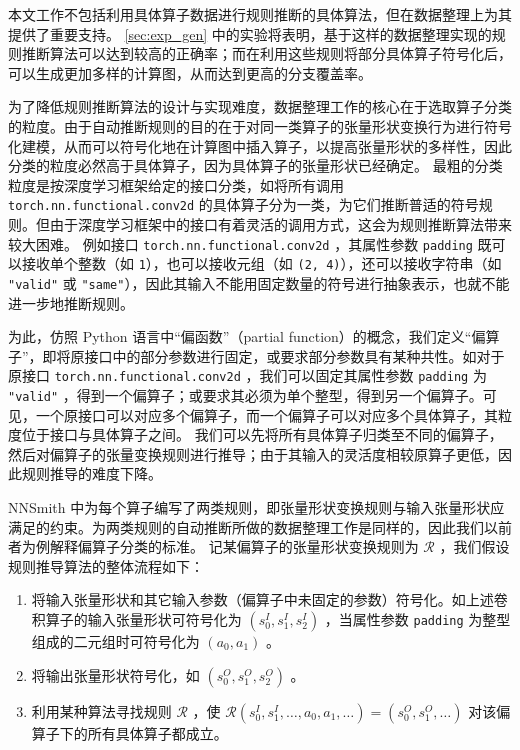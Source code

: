 本文工作不包括利用具体算子数据进行规则推断的具体算法，但在数据整理上为其提供了重要支持。 \ref{sec:exp_gen} 中的实验将表明，基于这样的数据整理实现的规则推断算法可以达到较高的正确率；而在利用这些规则将部分具体算子符号化后，可以生成更加多样的计算图，从而达到更高的分支覆盖率。

为了降低规则推断算法的设计与实现难度，数据整理工作的核心在于选取算子分类的粒度。由于自动推断规则的目的在于对同一类算子的张量形状变换行为进行符号化建模，从而可以符号化地在计算图中插入算子，以提高张量形状的多样性，因此分类的粒度必然高于具体算子，因为具体算子的张量形状已经确定。
最粗的分类粒度是按深度学习框架给定的接口分类，如将所有调用 \texttt{torch.nn.functional.conv2d} 的具体算子分为一类，为它们推断普适的符号规则。但由于深度学习框架中的接口有着灵活的调用方式，这会为规则推断算法带来较大困难。
例如接口 \texttt{torch.nn.functional.conv2d} \cite{torch_f_conv2d}，其属性参数 \texttt{padding} 既可以接收单个整数（如 \texttt{1}），也可以接收元组（如 \texttt{(2, 4)}），还可以接收字符串（如 \texttt{"valid"} 或 \texttt{"same"}），因此其输入不能用固定数量的符号进行抽象表示，也就不能进一步地推断规则。

为此，仿照 Python 语言中“偏函数”（partial function）\cite{python_partial}的概念，我们定义“偏算子”，即将原接口中的部分参数进行固定，或要求部分参数具有某种共性。如对于原接口 \texttt{torch.nn.functional.conv2d} ，我们可以固定其属性参数 \texttt{padding} 为 \texttt{"valid"} ，得到一个偏算子；或要求其必须为单个整型，得到另一个偏算子。可见，一个原接口可以对应多个偏算子，而一个偏算子可以对应多个具体算子，其粒度位于接口与具体算子之间。
我们可以先将所有具体算子归类至不同的偏算子，然后对偏算子的张量变换规则进行推导；由于其输入的灵活度相较原算子更低，因此规则推导的难度下降。

NNSmith 中为每个算子编写了两类规则，即张量形状变换规则与输入张量形状应满足的约束。为两类规则的自动推断所做的数据整理工作是同样的，因此我们以前者为例解释偏算子分类的标准。
记某偏算子的张量形状变换规则为 $\mathcal{R}$ ，我们假设规则推导算法的整体流程如下：
\begin{enumerate}
    \item 将输入张量形状和其它输入参数（偏算子中未固定的参数）符号化。如上述卷积算子的输入张量形状可符号化为 $(s^I_0, s^I_1, s^I_2)$ ，当属性参数 \texttt{padding} 为整型组成的二元组时可符号化为 $(a_0, a_1)$ 。
    \item 将输出张量形状符号化，如 $(s^O_0, s^O_1, s^O_2)$ 。
    \item 利用某种算法寻找规则 $\mathcal{R}$ ，使 $\mathcal{R}(s^I_0, s^I_1, \dots, a_0, a_1, \dots) = (s^O_0, s^O_1, \dots)$ 对该偏算子下的所有具体算子都成立。
\end{enumerate}

